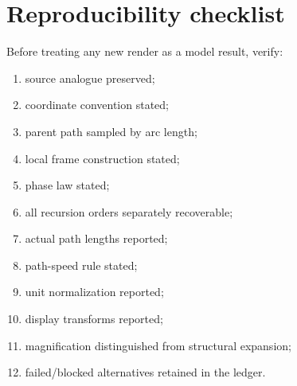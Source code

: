 \documentclass[aps,preprint,onecolumn,nofootinbib]{revtex4-2}
\begin{document}
\section{Reproducibility checklist}

Before treating any new render as a model result, verify:

\begin{enumerate}
\item source analogue preserved;
\item coordinate convention stated;
\item parent path sampled by arc length;
\item local frame construction stated;
\item phase law stated;
\item all recursion orders separately recoverable;
\item actual path lengths reported;
\item path-speed rule stated;
\item unit normalization reported;
\item display transforms reported;
\item magnification distinguished from structural expansion;
\item failed/blocked alternatives retained in the ledger.
\end{enumerate}
\end{document}
